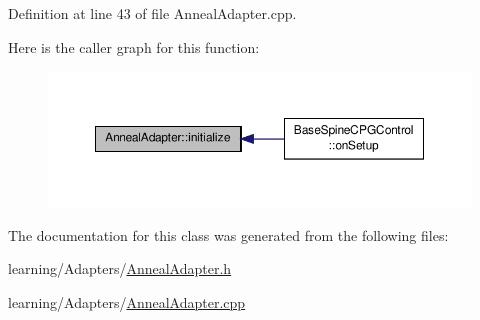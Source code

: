 Definition at line 43 of file Anneal\-Adapter.\-cpp.



Here is the caller graph for this function\-:\nopagebreak
\begin{figure}[H]
\begin{center}
\leavevmode
\includegraphics[width=350pt]{class_anneal_adapter_ac0ecb3b5380d94d99a8578297069f4bc_icgraph}
\end{center}
\end{figure}




The documentation for this class was generated from the following files\-:\begin{DoxyCompactItemize}
\item 
learning/\-Adapters/\hyperlink{_anneal_adapter_8h}{Anneal\-Adapter.\-h}\item 
learning/\-Adapters/\hyperlink{_anneal_adapter_8cpp}{Anneal\-Adapter.\-cpp}\end{DoxyCompactItemize}
